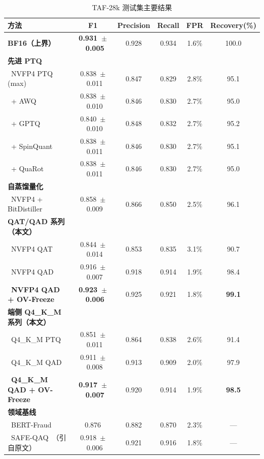 \documentclass[UTF8,a4paper,10pt,twocolumn]{ctexart}
\theoremstyle{plain}
\begin{document}
\begin{table}[H]
\centering
\caption{TAF-28k 测试集主要结果}
\label{tab:main_results}
\small
\begin{tabular}{lccccc}
\toprule
方法 & F1 & Precision & Recall & FPR & Recovery(\%) \\
\midrule
\textbf{BF16（上界）} & \textbf{0.931~$\pm$~0.005} & 0.928 & 0.934 & 1.6\% & 100.0 \\
\midrule
\textbf{先进 PTQ} & & & & & \\
~NVFP4 PTQ (max) & 0.838~$\pm$~0.011 & 0.847 & 0.829 & 2.8\% & 95.1 \\
~+ AWQ~\cite{lin2024awq} & 0.838~$\pm$~0.010 & 0.846 & 0.830 & 2.7\% & 95.0 \\
~+ GPTQ~\cite{frantar2023gptq} & 0.840~$\pm$~0.010 & 0.848 & 0.832 & 2.7\% & 95.2 \\
~+ SpinQuant~\cite{liu2025spinquant} & 0.838~$\pm$~0.011 & 0.846 & 0.830 & 2.7\% & 95.1 \\
~+ QuaRot~\cite{ashkboos2024quarot} & 0.838~$\pm$~0.011 & 0.846 & 0.830 & 2.7\% & 95.0 \\
\midrule
\textbf{自蒸馏量化} & & & & & \\
~NVFP4 + BitDistiller~\cite{du2024bitdistiller} & 0.858~$\pm$~0.009 & 0.866 & 0.850 & 2.5\% & 96.1 \\
\midrule
\textbf{QAT/QAD 系列（本文）} & & & & & \\
~NVFP4 QAT & 0.844~$\pm$~0.014 & 0.853 & 0.835 & 3.1\% & 90.7 \\
~NVFP4 QAD & 0.916~$\pm$~0.007 & 0.918 & 0.914 & 1.9\% & 98.4 \\
~\textbf{NVFP4 QAD + OV-Freeze} & \textbf{0.923~$\pm$~0.006} & 0.925 & 0.921 & 1.8\% & \textbf{99.1} \\
\midrule
\textbf{端侧 Q4\_K\_M 系列（本文）} & & & & & \\
~Q4\_K\_M PTQ & 0.851~$\pm$~0.011 & 0.864 & 0.838 & 2.6\% & 91.4 \\
~Q4\_K\_M QAD & 0.911~$\pm$~0.008 & 0.913 & 0.909 & 2.0\% & 97.9 \\
~\textbf{Q4\_K\_M QAD + OV-Freeze} & \textbf{0.917~$\pm$~0.007} & 0.920 & 0.914 & 1.9\% & \textbf{98.5} \\
\midrule
\textbf{领域基线} & & & & & \\
~BERT-Fraud~\cite{chen2024bert} & 0.876 & 0.882 & 0.870 & 2.3\% & --- \\
~SAFE-QAQ~\cite{wang2026safe}（引自原文） & 0.918~$\pm$~0.006 & 0.921 & 0.916 & 1.8\% & --- \\
\bottomrule
\end{tabular}
\end{table}
\end{document}
